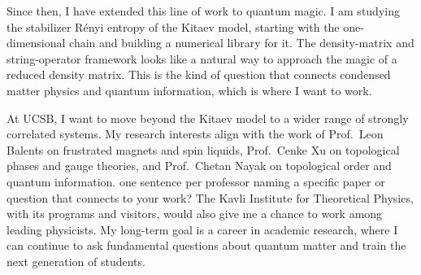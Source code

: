 Since then, I have extended this line of work to quantum magic. I am studying the stabilizer R\'enyi entropy of the Kitaev model, starting with the one-dimensional chain and building a numerical library for it. The density-matrix and string-operator framework looks like a natural way to approach the magic of a reduced density matrix. This is the kind of question that connects condensed matter physics and quantum information, which is where I want to work.

At UCSB, I want to move beyond the Kitaev model to a wider range of strongly correlated systems. My research interests align with the work of Prof.~Leon Balents on frustrated magnets and spin liquids, Prof.~Cenke Xu on topological phases and gauge theories, and Prof.~Chetan Nayak on topological order and quantum information. {\color{red}one sentence per professor naming a specific paper or question that connects to your work?} The Kavli Institute for Theoretical Physics, with its programs and visitors, would also give me a chance to work among leading physicists. My long-term goal is a career in academic research, where I can continue to ask fundamental questions about quantum matter and train the next generation of students.




